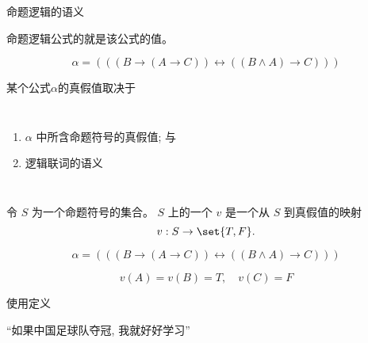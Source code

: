 
\begin{frame}{}
  \begin{center}
    命题逻辑的语义
  \end{center}
\end{frame}

\begin{frame}{}
  \begin{center}
    命题逻辑公式的就是该公式的值。

    \[
      \alpha = (((B \to (A \to C)) \leftrightarrow ((B \land A) \to C)))
    \]

    \pause
    \vspace{0.60cm}
    某个公式$\alpha$的真假值取决于
    \vspace{0.30cm}
    \begin{columns}
        \begin{enumerate}[(1)]
          \setlength{\itemsep}{6pt}
          \item $\alpha$ 中所含命题符号的真假值; 与
          \item 逻辑联词的语义
        \end{enumerate}
    \end{columns}
  \end{center}
\end{frame}

\begin{frame}{}
  \begin{definition}[真值指派 ($v$)]
    令 $S$ 为一个命题符号的集合。
    $S$ 上的一个 $v$ 是一个从 $S$ 到真假值的映射
    \[
      v: S \to \set{T, F}.
    \]
  \end{definition}

  \pause
  \vspace{0.30cm}
  \[
    \alpha = (((B \to (A \to C)) \leftrightarrow ((B \land A) \to C)))
  \]

  \[
    v(A) = v(B) = T, \quad v(C) = F
  \]
\end{frame}

\begin{frame}{}
  \begin{center}
    使用定义

    \vspace{0.30cm}
    \begin{definition}
      
    \end{definition}

    \vspace{0.60cm}
    ``如果中国足球队夺冠, 我就好好学习''
  \end{center}
\end{frame}

